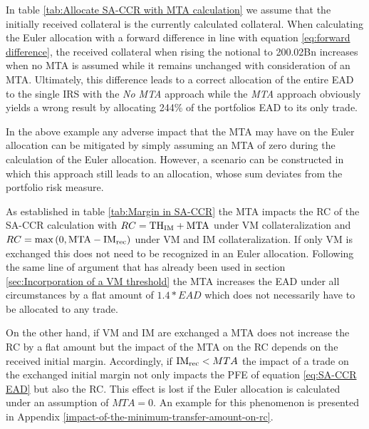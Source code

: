 \documentclass[../Thesis_AHoecherl.tex]{subfiles}
\begin{document}
    In table \ref{tab:Allocate SA-CCR with MTA calculation} we assume that the initially received collateral is the currently calculated collateral. 
    When calculating the Euler allocation with a forward difference  in line with equation \ref{eq:forward difference}, the received collateral when rising the notional to 200.02Bn increases when no \gls{MTA} is assumed while it remains unchanged with consideration of an MTA. 
    Ultimately, this difference leads to a correct allocation of the entire \gls{EAD} to the single \gls{IRS} with the \emph{No MTA} approach while the \emph{MTA} approach obviously yields a wrong result by allocating 244\% of the portfolios \gls{EAD} to its only trade.

    In the above example any adverse impact that the \gls{MTA} may have on the Euler allocation can be mitigated by simply assuming an \gls{MTA} of zero during the calculation of the Euler allocation.
    However, a scenario can be constructed in which this approach still leads to an allocation, whose sum deviates from the portfolio risk measure.

    As established in table \ref{tab:Margin in SA-CCR} the \gls{MTA} impacts the RC of the \gls{SA-CCR} calculation with $RC = \text{TH\textsubscript{IM}} + \text{MTA}$ under \gls{VM} collateralization and $RC = \max{\left(0, \text{MTA} - \text{IM\textsubscript{rec}}\right)}$ under \gls{VM} and \gls{IM} collateralization.
    If only \gls{VM} is exchanged this does not need to be recognized in an Euler allocation. Following the same line of argument that has already been used in section \ref{sec:Incorporation of a VM threshold} the \gls{MTA} increases the \gls{EAD} under all circumstances by a flat amount of $1.4*EAD$ which does not necessarily have to be allocated to any trade.

    On the other hand, if \gls{VM} and \gls{IM} are exchanged a \gls{MTA} does not increase the RC by a flat amount but the impact of the \gls{MTA} on the RC depends on the received initial margin. Accordingly, if $\text{IM\textsubscript{rec}} < MTA$ the impact of a trade on the exchanged initial margin not only impacts the PFE of equation \ref{eq:SA-CCR EAD} but also the RC. This effect is lost if the Euler allocation is calculated under an assumption of $MTA = 0$. An example for this phenomenon is presented in Appendix \ref{impact-of-the-minimum-transfer-amount-on-rc}.
\end{document}
